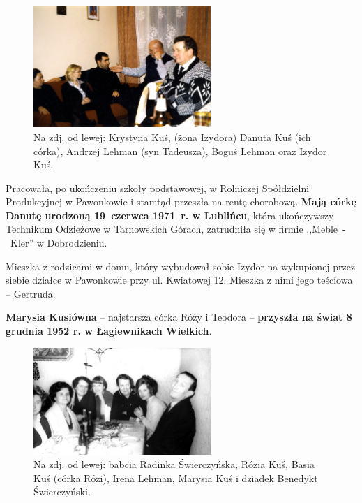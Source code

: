 \begin{figure}[!h]
\begin{center}
\includegraphics[width=0.6\textwidth]{photo/izydor_krystyna_kus_1.jpg}
\caption[Izydor Kuś]{Na zdj. od lewej: Krystyna Kuś, (żona Izydora) Danuta Kuś (ich córka), Andrzej Lehman (syn Tadeusza), Boguś Lehman oraz Izydor Kuś.}
\label{rys:izydor_krystyna_kus_1}
\end{center}
\end{figure}

Pracowała, po ukończeniu szkoły podstawowej, w Rolniczej Spółdzielni Produkcyjnej w Pawonkowie i stamtąd przeszła na rentę chorobową. \textbf{Mają córkę Danutę urodzoną 19~czerwca 1971~r. w Lublińcu}, która ukończywszy Technikum Odzieżowe w Tarnowskich Górach, zatrudniła się w firmie ,,Meble~-~Kler'' w Dobrodzieniu.

Mieszka z rodzicami w domu, który wybudował sobie Izydor na wykupionej przez siebie działce w Pawonkowie przy ul. Kwiatowej 12. Mieszka z nimi jego teściowa -- Gertruda.

\textbf{Marysia Kusiówna} -- najstarsza córka Róży i Teodora -- \textbf{przyszła na świat 8 grudnia 1952 r. w Łagiewnikach Wielkich}.
\begin{figure}[!h]
\begin{center}
\includegraphics[width=0.6\textwidth]{photo/maria_kus_1.jpg}
\caption[Marysia Kuś]{Na zdj. od lewej: babcia Radinka Świerczyńska, Rózia Kuś, Basia Kuś (córka Rózi), Irena Lehman, Marysia Kuś i dziadek Benedykt Świerczyński.}
\label{rys:maria_kus_1}
\end{center}
\end{figure}

